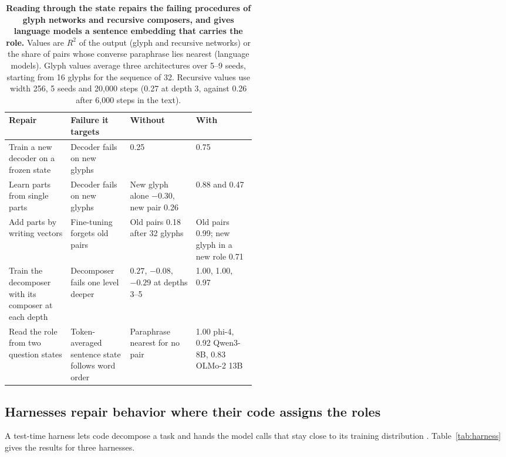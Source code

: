 \begin{table}[t]
  \caption{\textbf{Reading through the state repairs the failing procedures of glyph networks and recursive composers, and gives language models a sentence embedding that carries the role.} Values are $R^2$ of the output (glyph and recursive networks) or the share of pairs whose converse paraphrase lies nearest (language models). Glyph values average three architectures over 5--9 seeds, starting from 16 glyphs for the sequence of 32. Recursive values use width 256, 5 seeds and 20{,}000 steps (0.27 at depth 3, against 0.26 after 6{,}000 steps in the text).}
  \label{tab:remedies}
  \centering\small
  \begin{tabularx}{\linewidth}{@{}P{0.25\linewidth}P{0.24\linewidth}YY@{}}
    \toprule
    Repair & Failure it targets & Without & With \\
    \midrule
    Train a new decoder on a frozen state & Decoder fails on new glyphs & 0.25 & 0.75 \\
    Learn parts from single parts & Decoder fails on new glyphs & New glyph alone $-0.30$, new pair 0.26 & 0.88 and 0.47 \\
    Add parts by writing vectors & Fine-tuning forgets old pairs & Old pairs 0.18 after 32 glyphs & Old pairs 0.99; new glyph in a new role 0.71 \\
    Train the decomposer with its composer at each depth & Decomposer fails one level deeper & $0.27$, $-0.08$, $-0.29$ at depths 3--5 & 1.00, 1.00, 0.97 \\
    Read the role from two question states & Token-averaged sentence state follows word order & Paraphrase nearest for no pair & 1.00 phi-4, 0.92 Qwen3-8B, 0.83 OLMo-2 13B \\
    \bottomrule
  \end{tabularx}
\end{table}

\subsection{Harnesses repair behavior where their code assigns the roles}
\label{app:harness}

A test-time harness lets code decompose a task and hands the model calls that stay close to its training distribution \citep{zhang2025rlm,zhang2026harness}. Table~\ref{tab:harness} gives the results for three harnesses.

